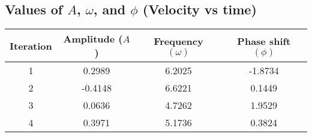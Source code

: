 \documentclass{report}
\begin{document}
    \bigbreak \noindent 
    \subsection{Values of $A$, $\omega$, and $\phi$ (Velocity vs time)}
    \begin{center}
        \begin{tabular}{c|c|c|c}
            Iteration & Amplitude ($A$) & Frequency $(\omega)$ & Phase shift $(\phi)$ \\ 
            \hline
            1 & 0.2989 & 6.2025 & -1.8734\\
            2 & -0.4148 & 6.6221 & 0.1449 \\
            3 & 0.0636 & 4.7262 & 1.9529 \\
            4 & 0.3971 & 5.1736 & 0.3824\\
        \end{tabular}
    \end{center}

    \pagebreak 
\end{document}
